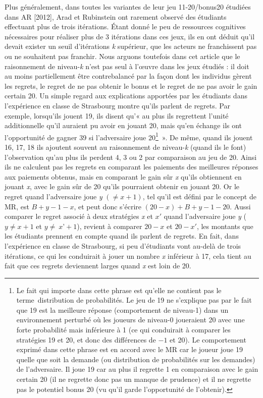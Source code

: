 \begin{Article}
\begin{refsection}[UmbhauerFR]
Plus généralement, dans toutes les variantes de leur jeu 11-20/bonus20
étudiées dans AR [2012], Arad et Rubinstein ont rarement observé des
étudiants effectuant plus de trois itérations. Étant donné le peu de
ressources cognitives nécessaires pour réaliser plus de 3 itérations
dans ces jeux, ils en ont déduit qu'il devait exister un seuil
d'itérations \emph{k} supérieur, que les acteurs ne franchissent pas ou
ne souhaitent pas franchir. Nous arguons toutefois dans cet article que
le raisonnement de niveau-\emph{k} n'est pas seul à l'œuvre dans les
jeux étudiés : il doit au moins partiellement être contrebalancé par la
façon dont les individus gèrent les regrets, le regret de ne pas obtenir
le bonus et le regret de ne pas avoir le gain certain 20. Un simple
regard aux explications apportées par les étudiants dans l'expérience en
classe de Strasbourg montre qu'ils parlent de regrets. Par exemple,
lorsqu'ils jouent 19, ils disent qu'« au plus ils regrettent l'unité
additionnelle qu'il auraient pu avoir en jouant 20, mais qu'en échange
ils ont l'opportunité de gagner 39 si l'adversaire joue 20\footnote{Le
  fait qui importe dans cette phrase est qu'elle ne contient pas le
  terme~distribution de probabilités. Le jeu de 19 ne s'explique pas par
  le fait que 19 est la meilleure réponse (comportement de niveau-1)
  dans un environnement perturbé où les joueurs de niveau-0 joueraient
  20 avec une forte probabilité mais inférieure à 1 (ce qui conduirait à
  comparer les stratégies 19 et 20, et donc des différences de $-1$ et
  20). Le comportement exprimé dans cette phrase est en accord avec le
  MR car le joueur joue 19 quelle que soit la demande (ou distribution
  de probabilités sur les demandes) de l'adversaire. Il joue 19 car au
  plus il regrette 1 en comparaison avec le gain certain 20 (il ne
  regrette donc pas un manque de prudence) et il ne regrette pas le
  potentiel bonus 20 (vu qu'il garde l'opportunité de l'obtenir).}~». De
même, quand ils jouent 16, 17, 18 ils ajoutent souvent au raisonnement
de niveau-\emph{k} (quand ils le font) l'observation qu'au plus ils perdent 4,
3 ou 2 par comparaison au jeu de 20. Ainsi ils ne calculent pas les
regrets en comparant les paiements des meilleures réponses aux paiements
obtenus, mais en comparant le gain sûr \emph{x} qu'ils obtiennent en
jouant \emph{x}, avec le gain sûr de 20 qu'ils pourraient obtenir en
jouant 20. Or le regret quand l'adversaire joue \emph{y}
\(( \neq x + 1)\), tel qu'il est défini par le concept de MR, est
\(B + y - 1 - x\), et peut donc s'écrire \((20 - x) + B + y - 1 - 20\).
Aussi comparer le regret associé à deux stratégies \emph{x} et $x'$
quand l'adversaire joue \emph{y} (\(y \neq x + 1\) et
\(y \neq \ x’ + 1\)), revient à comparer \(20 - x\) et \(20 - x'\), les
montants que les étudiants prennent en compte quand ils parlent de
regrets. En fait, dans l'expérience en classe de Strasbourg, si peu
d'étudiants vont au-delà de trois itérations, ce qui les conduirait à jouer
un nombre \emph{x} inférieur à 17, cela tient au fait que ces regrets
deviennent larges quand \emph{x} est loin de 20.


\end{refsection}
\end{Article}
